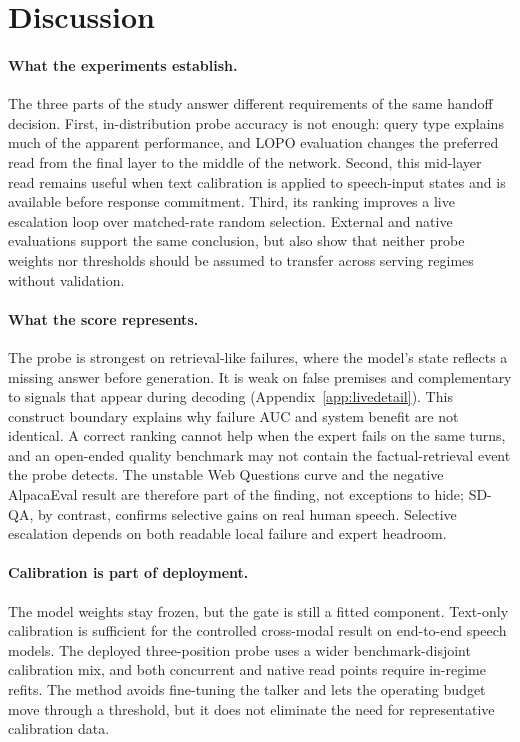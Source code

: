 \section{Discussion}
\label{sec:discussion}

\paragraph{What the experiments establish.}
The three parts of the study answer different requirements of the same
handoff decision. First, in-distribution probe accuracy is not enough:
query type explains much of the apparent performance, and LOPO
evaluation changes the preferred read from the final layer to the
middle of the network. Second, this mid-layer read remains useful when
text calibration is applied to speech-input states and is available
before response commitment. Third, its ranking improves a live
escalation loop over matched-rate random selection. External and native
evaluations support the same conclusion, but also show that neither
probe weights nor thresholds should be assumed to transfer across
serving regimes without validation.

\paragraph{What the score represents.}
The probe is strongest on retrieval-like failures, where the model's
state reflects a missing answer before generation. It is weak on false
premises and complementary to signals that appear during decoding
(Appendix~\ref{app:livedetail}). This construct boundary explains why
failure AUC and system benefit are not identical. A correct ranking
cannot help when the expert fails on the same turns, and an open-ended
quality benchmark may not contain the factual-retrieval event the probe
detects. The unstable Web Questions curve and the negative AlpacaEval
result are therefore part of the finding, not exceptions to hide;
SD-QA, by contrast, confirms selective gains on real human speech.
Selective escalation depends on both readable local failure and expert
headroom.

\paragraph{Calibration is part of deployment.}
The model weights stay frozen, but the gate is still a fitted
component. Text-only calibration is sufficient for the controlled
cross-modal result on end-to-end speech models. The deployed
three-position probe uses a wider benchmark-disjoint calibration mix,
and both concurrent and native read points require in-regime refits.
The method avoids fine-tuning the talker and lets the operating budget
move through a threshold, but it does not eliminate the need for
representative calibration data.

